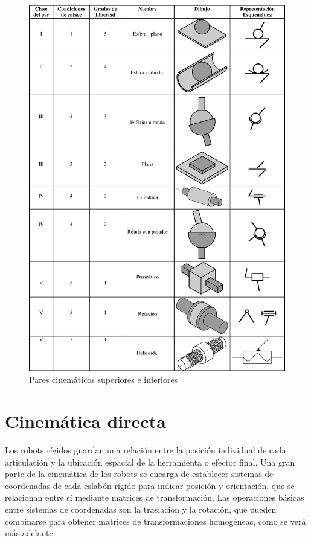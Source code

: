 \begin{figure}
	\centering
	\includegraphics[scale=1.0]{Capitulo2/figs/pares.png} 
	\caption{Pares cinemáticos superiores e inferiores}
	\label{pares}
\end{figure}

\section{Cinemática directa}

Los robots rígidos guardan una relación entre la posición individual de cada articulación y la ubicación espacial de la herramienta o efector final. Una gran parte de la cinemática de los robots se encarga de establecer sistemas de coordenadas de cada eslabón rígido para indicar posición y orientación, que se relacionan entre sí mediante matrices de transformación. Las operaciones básicas entre sistemas de coordenadas son la traslación y la rotación, que pueden combinarse para obtener matrices de transformaciones homogéneas, como se verá más adelante. \\\\

